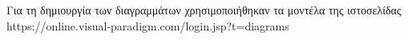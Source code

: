 \documentclass{article}
\begin{document}
\coverpages





\renewcommand*\refname{Βιβλιογραφία}

Για τη δημιουργία των διαγραμμάτων χρησιμοποιήθηκαν τα μοντέλα της ιστοσελίδας \newline 
https://online.visual-paradigm.com/login.jsp?t=diagrams
\end{document}
